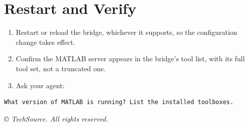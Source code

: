 \documentclass[11pt, letterpaper]{article}
\begin{document}
\section{Restart and Verify}

\begin{enumerate}
  \item Restart or reload the bridge, whichever it supports, so the configuration change takes
        effect.
  \item Confirm the MATLAB server appears in the bridge's tool list, with its full tool set, not
        a truncated one.
  \item Ask your agent:
\end{enumerate}

\begin{codeblock}
\begin{Verbatim}
What version of MATLAB is running? List the installed toolboxes.
\end{Verbatim}
\end{codeblock}


\vfill
\begin{center}
  {\color{TSgray}\scriptsize\textit{\copyright{} \the\year{} TechSource. All rights reserved.}}
\end{center}
\end{document}
